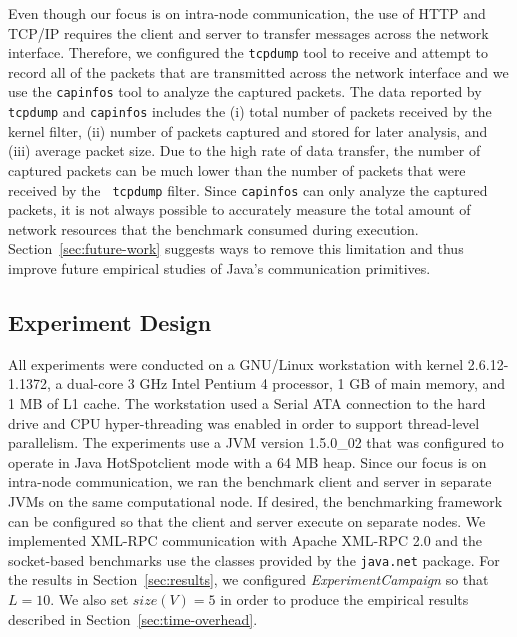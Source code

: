 \documentclass{sig-alternate}
\begin{document}
\begin{sloppypar}
Even though our focus is on intra-node communication, the use of HTTP
and TCP/IP requires the client and server to transfer messages across
the network interface.  Therefore, we configured the \texttt{tcpdump}
tool to receive and attempt to record all of the packets that are
transmitted across the network interface and we use the {\tt capinfos}
tool to analyze the captured packets.  The data reported by {\tt
  tcpdump} and {\tt capinfos} includes the (i) total number of packets
received by the kernel filter, (ii) number of packets captured and
stored for later analysis, and (iii) average packet size.  Due to the
high rate of data transfer, the number of captured packets can be much
lower than the number of packets that were received by the {\tt
  tcpdump} filter.  Since \texttt{capinfos} can only analyze the
captured packets, it is not always possible to accurately measure the
total amount of network resources that the benchmark consumed during
execution.  Section~\ref{sec:future-work} suggests ways to remove this
limitation and thus improve future empirical studies of Java's
communication primitives.
\end{sloppypar}



\vspace*{-.05in}
\subsection{Experiment Design}
\label{sec:design}



All experiments were conducted on a GNU/Linux workstation with kernel
2.6.12-1.1372, a dual-core 3 GHz Intel Pentium 4 processor, 1 GB of
main memory, and 1 MB of L1 cache.  The workstation used a Serial ATA
connection to the hard drive and CPU hyper-threading was enabled in
order to support thread-level parallelism.  The experiments use a JVM
version 1.5.0\_02 that was configured to operate in Java
HotSpot\texttrademark client mode with a 64 MB heap.  Since our focus
is on intra-node communication, we ran the benchmark client and server
in separate JVMs on the same computational node.  If desired, the
benchmarking framework can be configured so that the client and server
execute on separate nodes.  We implemented XML-RPC communication with
Apache XML-RPC 2.0 and the socket-based benchmarks use the classes
provided by the {\tt java.net} package. For the results in
Section~\ref{sec:results}, we configured {\em ExperimentCampaign} so
that $L=10$.  We also set $size(V) = 5$ in order to produce the
empirical results described in Section~\ref{sec:time-overhead}.
\end{document}
